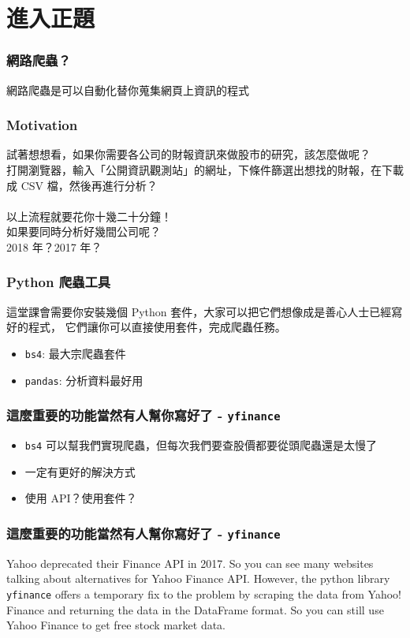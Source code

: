 \documentclass{beamer}
\newcommand{\code}[1]{\texttt{\textcolor{pinky}{#1}}}
\begin{document}
\section{進入正題}
\begin{frame}
  \frametitle{網路爬蟲？}
  網路爬蟲是可以自動化替你蒐集網頁上資訊的程式

\end{frame}

\begin{frame}
  \frametitle{Motivation}

  試著想想看，如果你需要各公司的財報資訊來做股市的研究，該怎麼做呢？\\
  打開瀏覽器，輸入「公開資訊觀測站」的網址，下條件篩選出想找的財報，在下載成 CSV 檔，然後再進行分析？\footnotemark\\
  \quad \\
  以上流程就要花你十幾二十分鐘！\\
  如果要同時分析好幾間公司呢？\\
  2018 年？2017 年？
\end{frame}

\begin{frame}
  \frametitle{Python 爬蟲工具}
  這堂課會需要你安裝幾個 Python 套件，大家可以把它們想像成是善心人士已經寫好的程式，
  它們讓你可以直接使用套件，完成爬蟲任務。

  \begin{itemize}
    \item \code{bs4}: 最大宗爬蟲套件
    \item \code{pandas}: 分析資料最好用
  \end{itemize}

\end{frame}

\begin{frame}
  \frametitle{這麼重要的功能當然有人幫你寫好了 - \code{yfinance}}
  \begin{itemize}
    \item \code{bs4} 可以幫我們實現爬蟲，但每次我們要查股價都要從頭爬蟲還是太慢了
    \item 一定有更好的解決方式
    \item 使用 API？使用套件？
  \end{itemize}
\end{frame}

\begin{frame}
  \frametitle{這麼重要的功能當然有人幫你寫好了 - \code{yfinance}}

  Yahoo deprecated their Finance API in 2017. So you can see many websites talking about alternatives for Yahoo Finance API. However, the python library \code{yfinance} offers a temporary fix to the problem by scraping the data from Yahoo! Finance and returning the data in the DataFrame format. So you can still use Yahoo Finance to get free stock market data\footnotemark.


\end{frame}
\end{document}
